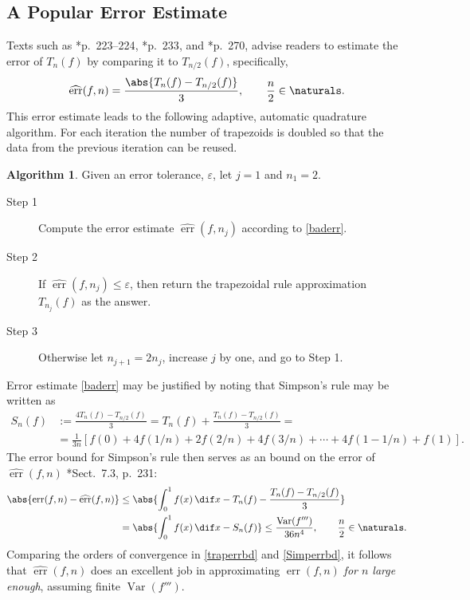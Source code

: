 \documentclass[]{article}
\DeclareMathOperator{\Var}{Var}
\DeclareMathOperator{\err}{err}
\newcommand{\herr}{\widehat{\err}}
\theoremstyle{definition}
\newtheorem{algo}{Algorithm}
\theoremstyle{remark}
\begin{document}
\subsection{A Popular Error Estimate}
Texts such as *{p.\ 223--224}, *{p.\ 233}, and  *{p.\ 270}, advise readers to estimate the error of $T_n(f)$ by comparing it to $T_{n/2}(f)$, specifically,
\begin{equation}\label{baderr}
\herr(f,n) = \frac{\abs{T_n(f) - T_{n/2}(f)}}{3}, \qquad \frac n2 \in \naturals.
\end{equation}
This error estimate leads to the following adaptive, automatic  quadrature algorithm. For each iteration the number of trapezoids is doubled so that the data from the previous iteration can be reused. 

\begin{algo} \label{baderralgo} Given an error tolerance, $\varepsilon$, let $j=1$ and $n_1=2$.

\begin{description} 

\item[Step 1] Compute the error estimate $\herr(f,n_j)$ according to \eqref{baderr}.

\item [Step 2] If $\herr(f,n_j) \le \varepsilon$, then return the trapezoidal rule approximation $T_{n_j}(f)$ as the answer.  

\item [Step 3] Otherwise let $n_{j+1}=2 n_j$, increase $j$ by one, and go to Step 1.

\end{description}

\end{algo}

Error estimate \eqref{baderr} may be justified by noting that Simpson's rule may be written as 
\begin{align*}
S_n(f) &:= \frac{4T_n(f) - T_{n/2}(f)}{3} =  T_n(f) + \frac{T_n(f) - T_{n/2}(f)}{3}= \\
& = \frac{1}{3n} \left [ f(0) + 4 f(1/n) + 2 f(2/n) + 4 f(3/n) + \cdots + 4 f(1-1/n) + f(1) \right].
\end{align*}
The error bound for Simpson's rule then serves as an bound on the error of $\herr(f,n)$ \cite{BraPet11a}*{Sect.\ 7.3, p.\ 231}:
\begin{align} \label{Simperrbd}
\abs{\err(f,n) - \herr(f,n)} & \le \abs{\int_0^1 f(x) \, \dif x - T_n(f) - \frac{T_n(f) - T_{n/2}(f)}{3}} \\
\nonumber
& = \abs{\int_0^1 f(x) \, \dif x - S_n(f)}  \le \frac{\Var(f''')}{36n^4}, \qquad \frac{n}2 \in \naturals. 
\end{align}
Comparing the orders of convergence in \eqref{traperrbd} and \eqref{Simperrbd}, it follows that $\herr(f,n)$ does an excellent job in approximating $\err(f,n)$ \emph{for $n$ large enough}, assuming finite $\Var(f''')$.
\end{document}
